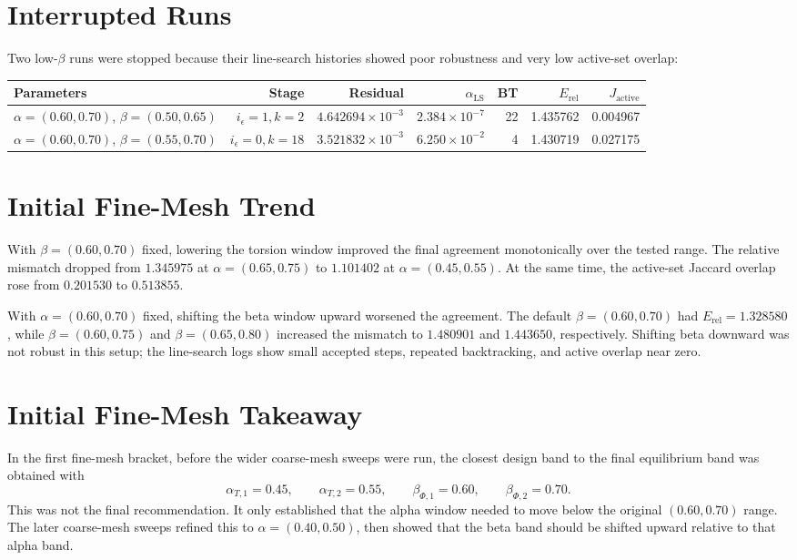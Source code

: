 \documentclass[11pt]{article}
\begin{document}
\section{Interrupted Runs}

Two low-\(\beta\) runs were stopped because their line-search histories showed
poor robustness and very low active-set overlap:

\begin{center}
\small
\begin{tabular}{@{}lrrrrrr@{}}
\toprule
Parameters & Stage & Residual & \(\alpha_{\mathrm{LS}}\) & BT & \(E_{\mathrm{rel}}\) & \(J_{\mathrm{active}}\) \\
\midrule
\(\alpha=(0.60,0.70)\), \(\beta=(0.50,0.65)\) & \(i_\epsilon=1,k=2\) & \(4.642694{\times}10^{-3}\) & \(2.384{\times}10^{-7}\) & 22 & 1.435762 & 0.004967 \\
\(\alpha=(0.60,0.70)\), \(\beta=(0.55,0.70)\) & \(i_\epsilon=0,k=18\) & \(3.521832{\times}10^{-3}\) & \(6.250{\times}10^{-2}\) & 4 & 1.430719 & 0.027175 \\
\bottomrule
\end{tabular}
\end{center}

\section{Initial Fine-Mesh Trend}

With \(\beta=(0.60,0.70)\) fixed, lowering the torsion window improved the
final agreement monotonically over the tested range.  The relative mismatch
dropped from \(1.345975\) at \(\alpha=(0.65,0.75)\) to \(1.101402\) at
\(\alpha=(0.45,0.55)\).  At the same time, the active-set Jaccard overlap rose
from \(0.201530\) to \(0.513855\).

With \(\alpha=(0.60,0.70)\) fixed, shifting the beta window upward worsened the
agreement.  The default \(\beta=(0.60,0.70)\) had
\(E_{\mathrm{rel}}=1.328580\), while \(\beta=(0.60,0.75)\) and
\(\beta=(0.65,0.80)\) increased the mismatch to \(1.480901\) and \(1.443650\),
respectively.  Shifting beta downward was not robust in this setup; the
line-search logs show small accepted steps, repeated backtracking, and active
overlap near zero.

\section{Initial Fine-Mesh Takeaway}

In the first fine-mesh bracket, before the wider coarse-mesh sweeps were run,
the closest design band to the final equilibrium band was obtained with
\[
\alpha_{T,1}=0.45,\qquad
\alpha_{T,2}=0.55,\qquad
\beta_{\Phi,1}=0.60,\qquad
\beta_{\Phi,2}=0.70.
\]
This was not the final recommendation.  It only established that the alpha
window needed to move below the original \((0.60,0.70)\) range.  The later
coarse-mesh sweeps refined this to \(\alpha=(0.40,0.50)\), then showed that the
beta band should be shifted upward relative to that alpha band.
\end{document}

